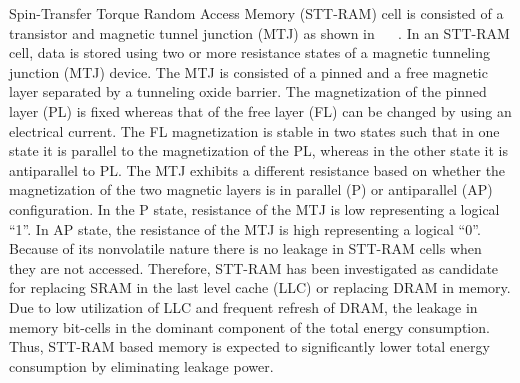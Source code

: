 Spin-Transfer Torque Random Access Memory (STT-RAM) cell is consisted of a transistor and magnetic tunnel junction (MTJ) as shown in ~ ~\cite{aware}. In an STT-RAM cell, data is stored using two or more resistance states of a magnetic tunneling junction (MTJ) device. The MTJ is consisted of a pinned and a free magnetic layer separated by a tunneling oxide barrier. The magnetization of the pinned layer (PL) is fixed whereas that of the free layer (FL) can be changed by using an electrical current. The FL magnetization is stable in two states such that in one state it is parallel to the magnetization of the PL, whereas in the other state it is antiparallel to PL. The MTJ exhibits a different resistance based on whether the magnetization of the two magnetic layers is in parallel (P) or antiparallel (AP) configuration. In the P state, resistance of the MTJ is low representing a logical “1”. In AP state, the resistance of the MTJ is high representing a logical “0”. Because of its nonvolatile nature there is no leakage in STT-RAM cells when they are not accessed. Therefore, STT-RAM has been investigated as candidate for replacing SRAM in the last level cache (LLC) or replacing DRAM in memory. Due to low utilization of LLC and frequent refresh of DRAM, the leakage in memory bit-cells in the dominant component of the total energy consumption. Thus, STT-RAM based memory is expected to significantly lower total energy consumption by eliminating leakage power.  



